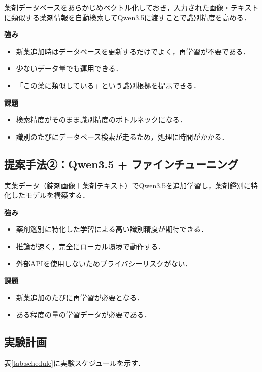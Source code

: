 \documentclass{ltjsarticle}
\begin{document}
薬剤データベースをあらかじめベクトル化しておき，入力された画像・テキストに類似する薬剤情報を自動検索してQwen3.5に渡すことで識別精度を高める．

\textbf{強み}
\begin{itemize}
  \item 新薬追加時はデータベースを更新するだけでよく，再学習が不要である．
  \item 少ないデータ量でも運用できる．
  \item 「この薬に類似している」という識別根拠を提示できる．
\end{itemize}

\textbf{課題}
\begin{itemize}
  \item 検索精度がそのまま識別精度のボトルネックになる．
  \item 識別のたびにデータベース検索が走るため，処理に時間がかかる．
\end{itemize}

\subsection{提案手法②：Qwen3.5 + ファインチューニング}

実薬データ（錠剤画像＋薬剤テキスト）でQwen3.5を追加学習し，薬剤鑑別に特化したモデルを構築する．

\textbf{強み}
\begin{itemize}
  \item 薬剤鑑別に特化した学習による高い識別精度が期待できる．
  \item 推論が速く，完全にローカル環境で動作する．
  \item 外部APIを使用しないためプライバシーリスクがない．
\end{itemize}

\textbf{課題}
\begin{itemize}
  \item 新薬追加のたびに再学習が必要となる．
  \item ある程度の量の学習データが必要である．
\end{itemize}

\subsection{実験計画}

表\ref{tab:schedule}に実験スケジュールを示す．
\end{document}

